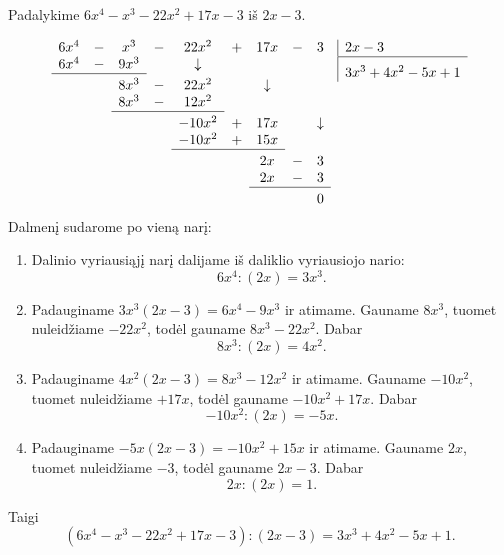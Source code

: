 \documentclass[11pt,a4paper]{scrartcl}
\begin{document}
\begin{example}
Padalykime $6x^4-x^3-22x^2+17x-3$ iš $2x-3$.

\setlength{\arraycolsep}{2pt}
\renewcommand{\arraystretch}{1.1}
\[
\begin{array}[t]{ccccccccc}
  6x^4 & - & x^3  & - & 22x^2 & + & 17x & - & 3 \\
  6x^4 & - & 9x^3 &   & \downarrow & & & & \\
  \cline{1-3}
  \noalign{\vskip 3pt}
	  &   & 8x^3  & - & 22x^2 &   & \downarrow & & \\
	  &   & 8x^3  & - & 12x^2 &   &             & & \\
  \cline{3-5}
  \noalign{\vskip 3pt}
	  &   &       &   & -10x^2 & + & 17x &   & \downarrow \\
	  &   &       &   & -10x^2 & + & 15x &   & \\
  \cline{5-7}
  \noalign{\vskip 3pt}
	  &   &       &   &        &   & 2x & - & 3 \\
	  &   &       &   &        &   & 2x & - & 3 \\
  \cline{7-9}
  \noalign{\vskip 3pt}
	  &   &       &   &        &   &    &   & 0
\end{array}
\enskip
\begin{array}[t]{|@{\enskip}l}
  2x-3 \\
  \hline
  \rule{0pt}{14pt}3x^3+4x^2-5x+1
\end{array}
\]
Dalmenį sudarome po vieną narį:
\begin{enumerate}
	\item Dalinio vyriausiąjį narį dalijame iš daliklio vyriausiojo nario:
	\[
	6x^4:(2x)=3x^3.
	\]
	\item Padauginame $3x^3(2x-3)=6x^4-9x^3$ ir atimame. Gauname $8x^3$, tuomet nuleidžiame $-22x^2$, todėl gauname $8x^3-22x^2$. Dabar
	\[
	8x^3:(2x)=4x^2.
	\]
	\item Padauginame $4x^2(2x-3)=8x^3-12x^2$ ir atimame. Gauname $-10x^2$, tuomet nuleidžiame $+17x$, todėl gauname $-10x^2+17x$. Dabar
	\[
	-10x^2:(2x)=-5x.
	\]
	\item Padauginame $-5x(2x-3)=-10x^2+15x$ ir atimame. Gauname $2x$, tuomet nuleidžiame $-3$, todėl gauname $2x-3$. Dabar
	\[
	2x:(2x)=1.
	\]
\end{enumerate}
Taigi
\[
(6x^4-x^3-22x^2+17x-3):(2x-3)=3x^3+4x^2-5x+1.
\]
\end{example}
\end{document}
